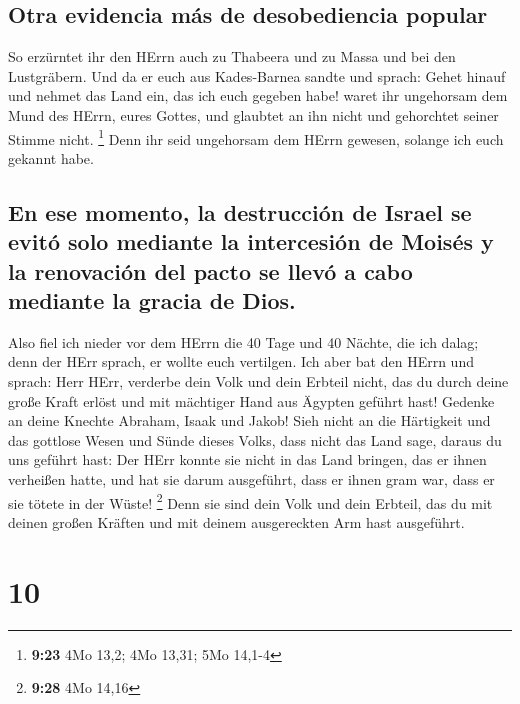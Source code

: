 \hypertarget{otra-evidencia-muxe1s-de-desobediencia-popular}{%
\subsection{Otra evidencia más de desobediencia
popular}\label{otra-evidencia-muxe1s-de-desobediencia-popular}}

 So erzürntet ihr den HErrn auch zu Thabeera und zu Massa
und bei den Lustgräbern.  Und da er euch aus Kades-Barnea
sandte und sprach: Gehet hinauf und nehmet das Land ein, das ich euch
gegeben habe! waret ihr ungehorsam dem Mund des HErrn, eures Gottes, und
glaubtet an ihn nicht und gehorchtet seiner Stimme nicht. \footnote{\textbf{9:23}
  4Mo 13,2; 4Mo 13,31; 5Mo 14,1-4}  Denn ihr seid
ungehorsam dem HErrn gewesen, solange ich euch gekannt habe.

\hypertarget{en-ese-momento-la-destrucciuxf3n-de-israel-se-evituxf3-solo-mediante-la-intercesiuxf3n-de-moisuxe9s-y-la-renovaciuxf3n-del-pacto-se-llevuxf3-a-cabo-mediante-la-gracia-de-dios.}{%
\subsection{En ese momento, la destrucción de Israel se evitó solo
mediante la intercesión de Moisés y la renovación del pacto se llevó a
cabo mediante la gracia de
Dios.}\label{en-ese-momento-la-destrucciuxf3n-de-israel-se-evituxf3-solo-mediante-la-intercesiuxf3n-de-moisuxe9s-y-la-renovaciuxf3n-del-pacto-se-llevuxf3-a-cabo-mediante-la-gracia-de-dios.}}

 Also fiel ich nieder vor dem HErrn die 40 Tage und 40
Nächte, die ich dalag; denn der HErr sprach, er wollte euch vertilgen.
 Ich aber bat den HErrn und sprach: Herr HErr, verderbe
dein Volk und dein Erbteil nicht, das du durch deine große Kraft erlöst
und mit mächtiger Hand aus Ägypten geführt hast!  Gedenke
an deine Knechte Abraham, Isaak und Jakob! Sieh nicht an die Härtigkeit
und das gottlose Wesen und Sünde dieses Volks,  dass
nicht das Land sage, daraus du uns geführt hast: Der HErr konnte sie
nicht in das Land bringen, das er ihnen verheißen hatte, und hat sie
darum ausgeführt, dass er ihnen gram war, dass er sie tötete in der
Wüste! \footnote{\textbf{9:28} 4Mo 14,16}  Denn sie sind
dein Volk und dein Erbteil, das du mit deinen großen Kräften und mit
deinem ausgereckten Arm hast ausgeführt.

\hypertarget{section-9}{%
\section{10}\label{section-9}}

